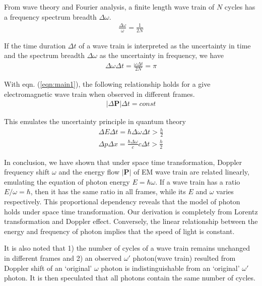 \documentclass[prd,showpacs,twocolumn]{revtex4-1}
\begin{document}
From wave theory and Fourier analysis, a finite length wave train of $N$ cycles has a frequency spectrum breadth $\Delta\omega$.
\begin{eqnarray}
\frac{\Delta\omega}{\omega}=\frac{1}{2N}
\label{eqn:Domega}
\end{eqnarray}

If the time duration $\Delta t$ of a wave train is interpreted as the uncertainty in time and the spectrum breadth $\Delta\omega$ as the uncertainty in frequency, we have
\begin{eqnarray}
\Delta\omega \Delta t=\frac{\omega \Delta t}{2N}=\pi
\label{eqn:DoDt}
\end{eqnarray}

With eqn. (\ref{eqn:main1}), the following relationship holds for a give electromagnetic wave train when observed in different frames.
\begin{eqnarray}
|\Delta \mathbf{P}| \Delta t=const
\label{eqn:t}
\end{eqnarray}

This emulates the uncertainty principle in quantum theory
\begin{eqnarray}
\Delta E \Delta t=\hbar\Delta\omega\Delta t>\frac{h}{2}\nonumber\\
\Delta p \Delta x=\frac{\hbar\Delta\omega}{c}c\Delta t>\frac{h}{2}
\label{eqn:uncertainty}
\end{eqnarray}

In conclusion, we have shown that under space time transformation, Doppler frequency shift $\omega$ and the energy flow $|\mathbf{P}|$ of EM wave train are related linearly, emulating the equation of photon energy $E=\hbar\omega$. If a wave train has a ratio $E/\omega=\hbar$, then it has the same ratio in all frames, while its $E$ and $\omega$ varies respectively. This proportional dependency reveals that the model of photon holds under space time transformation. Our derivation is completely from Lorentz transformation and Doppler effect. Conversely, the linear relationship between the energy and frequency of photon implies that the speed of light is constant.

It is also noted that 1) the number of cycles of a wave train remains unchanged in different frames and 2) an observed $\omega'$ photon(wave train) resulted from Doppler shift of an `original' $\omega$ photon is indistinguishable from an `original' $\omega'$ photon. It is then speculated that all photons contain the same number of cycles.

\end{document}
